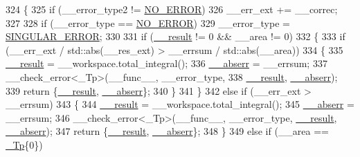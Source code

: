 \begin{DoxyCode}
324         \{
325           \textcolor{keywordflow}{if} (\_\_error\_type2 != \hyperlink{namespace____gnu__cxx_ad6c62dd86a596716cece6ac2d4cfd4b3ac31eecc280b10dec2efb4a2216ccc2e0}{NO\_ERROR})
326             \_\_err\_ext += \_\_correc;
327 
328           \textcolor{keywordflow}{if} (\_\_error\_type == \hyperlink{namespace____gnu__cxx_ad6c62dd86a596716cece6ac2d4cfd4b3ac31eecc280b10dec2efb4a2216ccc2e0}{NO\_ERROR})
329             \_\_error\_type = \hyperlink{namespace____gnu__cxx_ad6c62dd86a596716cece6ac2d4cfd4b3a8e955ea89d59c116d92f16f345620d04}{SINGULAR\_ERROR};
330 
331           \textcolor{keywordflow}{if} (\hyperlink{namespace____gnu__cxx_a500ea9f53aeaecd8c2ae657503450578}{\_\_result} != 0 && \_\_area != 0)
332             \{
333               \textcolor{keywordflow}{if} (\_\_err\_ext / std::abs(\_\_res\_ext) > \_\_errsum / std::abs(\_\_area))
334                 \{
335                   \hyperlink{namespace____gnu__cxx_a500ea9f53aeaecd8c2ae657503450578}{\_\_result} = \_\_workspace.total\_integral();
336                   \hyperlink{namespace____gnu__cxx_a72f736cff127f1574e91a301de9e074b}{\_\_abserr} = \_\_errsum;
337                   \_\_check\_error<\_Tp>(\_\_func\_\_, \_\_error\_type,
338                                      \hyperlink{namespace____gnu__cxx_a500ea9f53aeaecd8c2ae657503450578}{\_\_result}, \hyperlink{namespace____gnu__cxx_a72f736cff127f1574e91a301de9e074b}{\_\_abserr});
339                   \textcolor{keywordflow}{return} \{\hyperlink{namespace____gnu__cxx_a500ea9f53aeaecd8c2ae657503450578}{\_\_result}, \hyperlink{namespace____gnu__cxx_a72f736cff127f1574e91a301de9e074b}{\_\_abserr}\};
340                 \}
341             \}
342           \textcolor{keywordflow}{else} \textcolor{keywordflow}{if} (\_\_err\_ext > \_\_errsum)
343             \{
344               \hyperlink{namespace____gnu__cxx_a500ea9f53aeaecd8c2ae657503450578}{\_\_result} = \_\_workspace.total\_integral();
345               \hyperlink{namespace____gnu__cxx_a72f736cff127f1574e91a301de9e074b}{\_\_abserr} = \_\_errsum;
346               \_\_check\_error<\_Tp>(\_\_func\_\_, \_\_error\_type, \hyperlink{namespace____gnu__cxx_a500ea9f53aeaecd8c2ae657503450578}{\_\_result}, 
      \hyperlink{namespace____gnu__cxx_a72f736cff127f1574e91a301de9e074b}{\_\_abserr});
347               \textcolor{keywordflow}{return} \{\hyperlink{namespace____gnu__cxx_a500ea9f53aeaecd8c2ae657503450578}{\_\_result}, \hyperlink{namespace____gnu__cxx_a72f736cff127f1574e91a301de9e074b}{\_\_abserr}\};
348             \}
349           \textcolor{keywordflow}{else} \textcolor{keywordflow}{if} (\_\_area == \hyperlink{namespace____gnu__cxx_a3b19a9c800ca194374ef9172290f7d79}{\_Tp}\{0\})

\end{DoxyCode}
